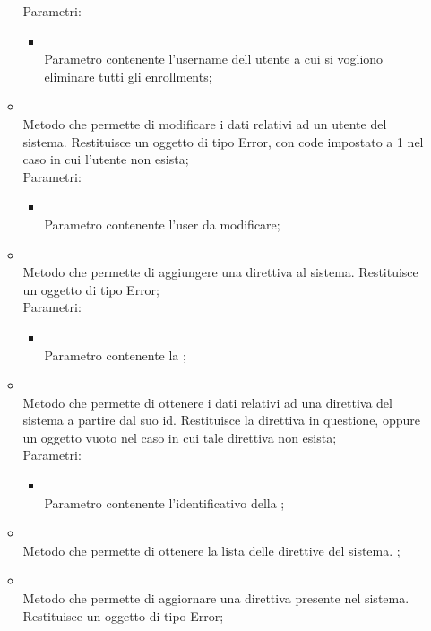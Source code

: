 \begin{itemize}
\begin{itemize}
		Parametri:
		\begin{itemize}
			\item {} \\
			Parametro contenente l'username dell utente a cui si vogliono eliminare tutti gli enrollments;
		\end{itemize}
		\item[]  \\
		Metodo che permette di modificare i dati relativi ad un utente del sistema. Restituisce un oggetto di tipo Error, con code impostato a 1 nel caso in cui l'utente non esista;\\
		Parametri:
		\begin{itemize}
			\item {} \\
			Parametro contenente l'user da modificare;
		\end{itemize}
		\item[]  \\
		Metodo che permette di aggiungere una direttiva al sistema. Restituisce un oggetto di tipo Error;\\
		Parametri:
		\begin{itemize}
			\item {} \\
			Parametro contenente la ;
		\end{itemize}
		\item[]  \\
		Metodo che permette di ottenere i dati relativi ad una direttiva del sistema a partire dal suo id. Restituisce la direttiva in questione, oppure un oggetto vuoto nel caso in cui tale direttiva non esista;\\
		Parametri:
		\begin{itemize}
			\item {} \\
			Parametro contenente l'identificativo della ;
		\end{itemize}
		\item[]  \\
		Metodo che permette di ottenere la lista delle direttive del sistema.
;\\
		\item[]  \\
		Metodo che permette di aggiornare una direttiva presente nel sistema. Restituisce un oggetto di tipo Error;\\

\end{itemize}
\end{itemize}
